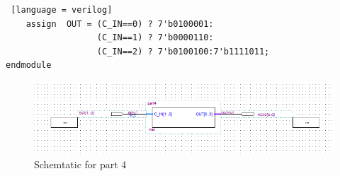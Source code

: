 \documentclass[a4paper, 12pt]{report}
\begin{document}
\begin{itemize}
\begin{lstlisting} [language = verilog]
    assign 	OUT = (C_IN==0) ? 7'b0100001: 
                  (C_IN==1) ? 7'b0000110: 
                  (C_IN==2) ? 7'b0100100:7'b1111011;
endmodule
        \end{lstlisting}
        \begin{figure}[h]
            \centering
            \includegraphics[width=\textwidth]{source/picture/Lab1/Lab1_4.png}
            \caption{Schemtatic for part 4}
        \end{figure}
\end{itemize}

\clearpage
\end{document}
